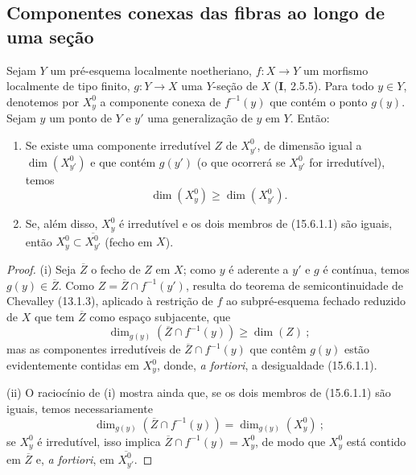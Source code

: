 \subsection{Componentes conexas das fibras ao longo de uma seção}
\label{subsection:IV.15.6}

\begin{proposition}[15.6.1]
\label{IV.15.6.1}
Sejam $Y$ um pré-esquema localmente noetheriano, $f:X\to Y$ um morfismo localmente de tipo finito, $g:Y\to X$ uma $Y$-seção de $X$ (\textbf{I}, 2.5.5). Para todo $y\in Y$, denotemos por $X_y^0$ a componente conexa de $f^{-1}(y)$ que contém o ponto $g(y)$. Sejam $y$ um ponto de $Y$ e $y'$ uma generalização de $y$ em $Y$. Então:
\begin{enumerate}[label=\emph{(\roman*)}]
  \item Se existe uma componente irredutível $Z$ de $X_{y'}^0$, de dimensão igual a $\dim(X_{y'}^0)$ e que contém $g(y')$ (o que ocorrerá se $X_{y'}^0$ for irredutível), temos
\begin{equation}
\tag{15.6.1.1}
\label{IV.15.6.1.1}
  \dim(X_y^0)\geqslant\dim(X_{y'}^0).
\end{equation}
  \item Se, além disso, $X_y^0$ é irredutível e os dois membros de (15.6.1.1) são iguais, então $X_y^0\subset\overline{X_{y'}^0}$ (fecho em $X$).
\end{enumerate}
\end{proposition}

\begin{proof}
(i) Seja $\overline Z$ o fecho de $Z$ em $X$; como $y$ é aderente a $y'$ e $g$ é contínua, temos $g(y)\in\overline Z$. Como $Z=\overline Z\cap f^{-1}(y')$, resulta do teorema de semicontinuidade de Chevalley (13.1.3), aplicado à restrição de $f$ ao subpré-esquema fechado reduzido de $X$ que tem $\overline Z$ como espaço subjacente, que
\[
  \dim_{g(y)}(\overline Z\cap f^{-1}(y))\geqslant\dim(Z)~;
\]
mas as componentes irredutíveis de $\overline Z\cap f^{-1}(y)$ que contêm $g(y)$ estão evidentemente contidas em $X_y^0$, donde, \emph{a fortiori}, a desigualdade (15.6.1.1).

(ii) O raciocínio de (i) mostra ainda que, se os dois membros de (15.6.1.1) são iguais, temos necessariamente
\[
  \dim_{g(y)}(\overline Z\cap f^{-1}(y))=\dim_{g(y)}(X_y^0)~;
\]
se $X_y^0$ é irredutível, isso implica $\overline Z\cap f^{-1}(y)=X_y^0$, de modo que $X_y^0$ está contido em $\overline Z$ e, \emph{a fortiori}, em $\overline{X_{y'}^0}$.
\end{proof}

